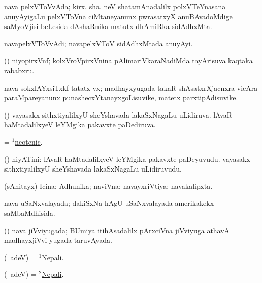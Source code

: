 \bentry
{}
\gl{\nA}
\bmng
nava pelxVToVvAda; kirx. sha. neV shatamAnadalilx polxVTeYnasana anuyAyigaLu pelxVToVna ciMtaneyanunx pwrasatxyX anuBAvadoMdige saMyoVjisi beLesida dAshaRnika matutx dhAmiRka sidAdhxMta. 
\emng
\eentry

\bentry
{}
\gl{\nA}
\bmng
navapelxVToVvAdi; navapelxVToV sidAdhxMtada anuyAyi. 
\emng
\eentry

\bentry
{}
\gl{\nA}
\bmng
(\ravi) niyopirxVnf; kolxVroVpirxVnina pAlimariVkaraNadiMda tayArisuva kaqtaka rababxru. 
\emng
\eentry

\bentry
{}
\gl{\nA}
\bmng
nava sokxlAYxsiTxkf tatatx vx; madhayxyugada takaR shAsatxrXjacnxra vicAra paraMpareyanunx punashecxYtanayxgoLisuvike, matetx parxtipAdisuvike. 
\emng
\eentry

\bentry
{}
\gl{\gu}
\bmng
(\jiVvi) 
\banum
{} vayasakx sithxtiyalilxyU sheYshavada lakaSxNagaLu uLidiruva. 
 lAvaR haMtadalilxyeV leYMgika pakavxte paDediruva. 
\eanum
\emng
\eentry

\bentry
{}
\gl{\gu}
\bmng
= \hyperlink{neotenic}{$^1$neotenic}. 
\emng
\eentry

\bentry
{}
\gl{\nA}
\bmng
(\jiVvi) niyATini: 
\banum
{} lAvaR haMtadalilxyeV leYMgika pakavxte paDeyuvudu. 
 vayasakx sithxtiyalilxyU sheYshavada lakaSxNagaLu uLidiruvudu. 
\eanum
\emng
\eentry

\bentry
{}
\gl{\gu}
\bmng
(sAhitayx) Icina; Adhunika; naviVna; navayxriVtiya; navakalipxta. 
\emng
\eentry

\bentry
{}
\gl{\gu}
\bmng
nava uSaNxvalayada; dakiSxNa hAgU uSaNxvalayada amerikakekx saMbaMdhisida. 
\emng
\eentry

\bentry
{}
\gl{\gu}
\bmng
(\BUvi) nava jiVviyugada; BUmiya itihAsadalilx pArxciVna jiVviyuga athavA madhayxjiVvi yugada taruvAyada. 
\emng
\eentry

\bentry
{}
\gl{\gu}
\bmng
(\bava\ adeV) = \hyperlink{Nepali(1)}{$^1$Nepali}. 
\emng
\eentry

\bentry
{}
\gl{\nA}
\bmng
(\bava\ adeV) = \hyperlink{Nepali(2)}{$^2$Nepali}. 
\emng
\eentry

